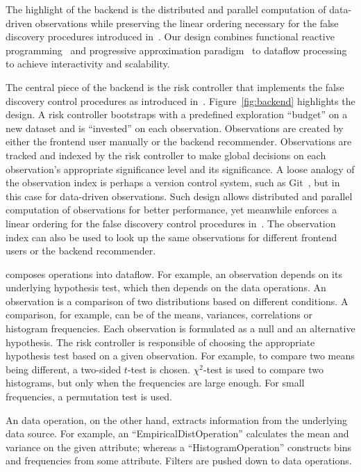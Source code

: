 The highlight of the \system{} backend is the distributed and parallel computation of data-driven observations while preserving the linear ordering necessary for the false discovery procedures introduced in~\cite{zhao2016controlling}.  Our design combines functional reactive programming~\cite{wan2000functional} and progressive approximation paradigm~\cite{onlineagg,zgraggen2016progressive,vizdom} to dataflow processing to achieve interactivity and scalability.

The central piece of the \system{} backend is the risk controller that implements the false discovery control procedures as introduced in~\cite{zhao2016controlling}.  Figure~\ref{fig:backend} highlights the design.  A risk controller bootstraps with a predefined exploration ``budget'' on a new dataset and is ``invested'' on each observation.  Observations are created by either the frontend user manually or the backend recommender.  Observations are tracked and indexed by the risk controller to make global decisions on each observation's appropriate significance level and its significance. A loose analogy of the observation index is perhaps a version control system, such as Git~\cite{torvalds2010git}, but in this case for data-driven observations. Such design allows distributed and parallel computation of observations for better performance, yet meanwhile enforces a linear ordering for the false discovery control procedures in~\cite{zhao2016controlling}. The observation index can also be used to look up the same observations for different frontend users or the backend recommender. 

\system{} composes operations into dataflow.  For example, an observation depends on its underlying hypothesis test, which then depends on the data operations.  An observation is a comparison of two distributions based on different conditions.  A comparison, for example, can be of the means, variances, correlations or histogram frequencies. Each observation is formulated as a null and an alternative hypothesis.  The risk controller is responsible of choosing the appropriate hypothesis test based on a given observation.  For example, to compare two means being different, a two-sided $t$-test is chosen.  $\chi^2$-test is used to compare two histograms, but only when the frequencies are large enough. For small frequencies, a permutation test is used. 

An data operation, on the other hand, extracts information from the underlying data source.  For example, an ``EmpiricalDistOperation'' calculates the mean and variance on the given attribute; whereas a ``HistogramOperation'' constructs bins and frequencies from some attribute.  Filters are pushed down to data operations.

